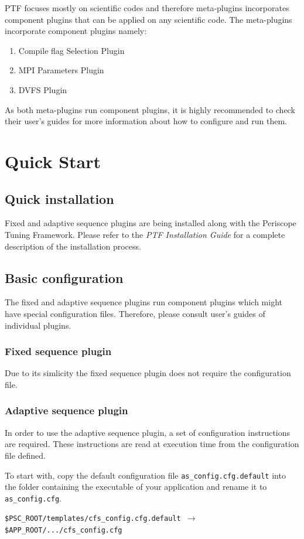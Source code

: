 \documentclass[11pt,a4paper, oneside]{book} %
\begin{document}
PTF focuses mostly on scientific codes and therefore meta-plugins incorporates component plugins that can be applied on any scientific code. The meta-plugins incorporate component plugins namely:
\begin{enumerate}
\item Compile flag Selection Plugin
\item MPI Parameters Plugin
\item DVFS Plugin
\end{enumerate}

As both meta-plugins run component plugins, it is highly recommended to check their user's guides for more information about how to configure and run them.

\chapter{Quick Start}
\section{Quick installation}
Fixed and adaptive sequence plugins are being installed along with the Periscope Tuning Framework. Please refer to the \textit{PTF Installation Guide} for a complete description of the installation process.

\section{Basic configuration}

The fixed and adaptive sequence plugins run component plugins which might have special configuration files. Therefore, please consult user's guides of individual plugins.

\subsection{Fixed sequence plugin}
Due to its simlicity the fixed sequence plugin does not require the configuration file.

\subsection{Adaptive sequence plugin}

In order to use the adaptive sequence plugin, a set of configuration instructions are required. These instructions are read at execution time from the configuration file defined.

To start with, copy the default configuration file \texttt{as\_config.cfg.default} into the folder containing the executable of your application and rename it to \texttt{as\_config.cfg}.
\begin{center}
\begin{minipage}{0.8\textwidth}
\texttt{\$PSC\_ROOT/templates/cfs\_config.cfg.default $\rightarrow$ \$APP\_ROOT/.../cfs\_config.cfg}
\end{minipage}
\end{center}
\end{document}
